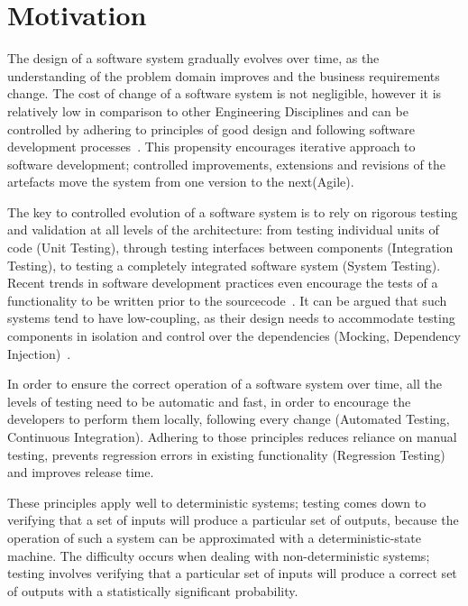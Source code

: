 \section{Motivation}

The design of a software system gradually evolves over time, as the understanding of the problem domain improves and the business requirements change. The cost of change of a software system is not negligible, however it is relatively low in comparison to other Engineering Disciplines and can be controlled by adhering to principles of good design and following software development processes~\cite{Gof1995}. This propensity encourages iterative approach to software development; controlled improvements, extensions and revisions of the artefacts move the system from one version to the next(Agile). 

The key to controlled evolution of a software system is to rely on rigorous testing and validation at all levels of the architecture: from testing individual units of code (Unit Testing), through testing interfaces between components (Integration Testing), to testing a completely integrated software system (System Testing). Recent trends in software development practices even encourage the tests of a functionality to be written prior to the sourcecode~\cite{Beck2001}. It can be argued that such systems tend to have low-coupling, as their design needs to accommodate testing components in isolation and control over the dependencies (Mocking, Dependency Injection)~\cite{Myers2004}.

In order to ensure the correct operation of a software system over time, all the levels of testing need to be automatic and fast, in order to encourage the developers to perform them locally, following every change (Automated Testing, Continuous Integration). Adhering to those principles reduces reliance on manual testing, prevents regression errors in existing functionality (Regression Testing) and improves release time.

These principles apply well to deterministic systems; testing comes down to verifying that a set of inputs will produce a particular set of outputs, because the operation of such a system can be approximated with a deterministic-state machine. The difficulty occurs when dealing with non-deterministic systems; testing involves verifying that a particular set of inputs will produce a correct set of outputs with a statistically significant probability.

